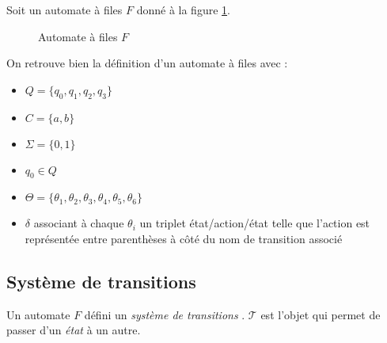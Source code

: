 \begin{example}
  Soit un automate à files $F$ donné à la figure \ref{fig:fifo1}.

  \begin{figure}[H]
    \centering
    \caption{Automate à files $F$}\label{fig:fifo1}
  \end{figure}

  On retrouve bien la définition d'un automate à files \fifo avec :
  \begin{itemize}
    \item $Q=\{q_0,q_1,q_2,q_3\}$
    \item $C=\{a,b\}$
    \item $\Sigma=\{0,1\}$
    \item $q_0\in Q$
    \item $\Theta=\{\theta_1, \theta_2, \theta_3, \theta_4, \theta_5, \theta_6\}$
    \item $\delta$ associant à chaque $\theta_i$ un triplet état/action/état telle que l'action est représentée entre parenthèses à côté du nom de transition associé
  \end{itemize}
\end{example}


\subsection{Système de transitions}\label{fifo:trans}


Un automate $F$ défini un \emph{système de transitions} \tsys. $\mathcal{T}$ est l'objet qui permet de passer d'un \emph{état} à un autre.

